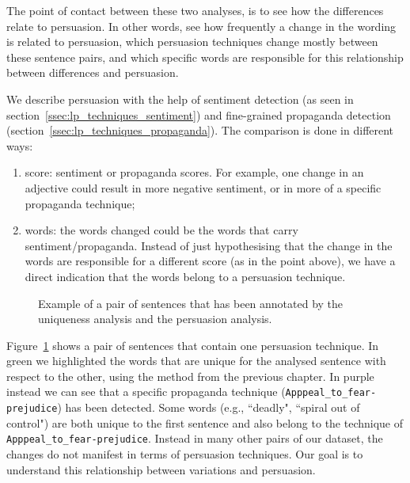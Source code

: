 The point of contact between these two analyses, is to see how the differences relate to persuasion. In other words, see how frequently a change in the wording is related to persuasion, which persuasion techniques change mostly between these sentence pairs, and which specific words are responsible for this relationship between differences and persuasion.

We describe persuasion with the help of sentiment detection (as seen in section~\ref{ssec:lp_techniques_sentiment}) and fine-grained propaganda detection (section~\ref{ssec:lp_techniques_propaganda}).
The comparison is done in different ways:
\begin{enumerate}
    \item score: sentiment or propaganda scores. For example, one change in an adjective could result in more negative sentiment, or in more of a specific propaganda technique;
    \item words: the words changed could be the words that carry sentiment/propaganda. Instead of just hypothesising that the change in the words are responsible for a different score (as in the point above), we have a direct indication that the words belong to a persuasion technique.
\end{enumerate}

\begin{figure}[!htbp]
    \centering
    \caption{Example of a pair of sentences that has been annotated by the uniqueness analysis and the persuasion analysis.}
    \label{fig:annotated_clique_data}
\end{figure}

Figure~\ref{fig:annotated_clique_data} shows a pair of sentences that contain one persuasion technique.
In green we highlighted the words that are unique for the analysed sentence with respect to the other, using the method from the previous chapter.
In purple instead we can see that a specific propaganda technique (\texttt{Apppeal\_to\_fear-prejudice}) has been detected.
Some words (e.g., ``deadly", ``spiral out of control") are both unique to the first sentence and also belong to the technique of \texttt{Apppeal\_to\_fear-prejudice}. Instead in many other pairs of our dataset, the changes do not manifest in terms of persuasion techniques.
Our goal is to understand this relationship between variations and persuasion.

